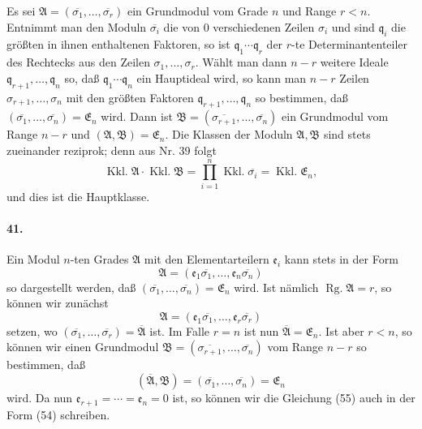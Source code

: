 \documentclass[11pt]{article}
\newcommand{\Rg}{\operatorname{Rg.}}
\newcommand{\Kkl}{\operatorname{Kkl.}}
\begin{document}
Es sei $\mathfrak A=(\overline{\sigma_1},
\ldots,
\overline{\sigma_r})$ ein Grundmodul vom Grade $n$ und Range $r<n$. Entnimmt man den Moduln $\overline{\sigma_i}$ die von $0$ verschiedenen Zeilen $\sigma_i$ und sind $\mathfrak q_i$ die größten in ihnen enthaltenen Faktoren, so ist $\mathfrak q_1\cdots\mathfrak q_r$ der $r$-te Determinantenteiler des Rechtecks aus den Zeilen $\sigma_1,
\ldots,
\sigma_r$. Wählt man dann $n-r$ weitere Ideale $\mathfrak q_{r+1},
\ldots,
\mathfrak q_n$ so, daß $\mathfrak q_1\cdots\mathfrak q_n$ ein Hauptideal wird, so kann man $n-r$ Zeilen $\sigma_{r+1},
\ldots,
\sigma_n$ mit den größten Faktoren $\mathfrak q_{r+1},
\ldots,
\mathfrak q_n$ so bestimmen, daß $(\overline{\sigma_1},
\ldots,
\overline{\sigma_n})=\mathfrak E_n$ wird. Dann ist $\mathfrak B=(\overline{\sigma_{r+1}},
\ldots,
\overline{\sigma_n})$ ein Grundmodul vom Range $n-r$ und $(\mathfrak A,
\mathfrak B)=\mathfrak E_n$. Die Klassen der Moduln $\mathfrak A,
\mathfrak B$ sind stets zueinander reziprok; denn aus Nr. 39 folgt
\[
\Kkl\mathfrak A\cdot\Kkl\mathfrak B
=\prod_{i=1}^{n}\Kkl\overline{\sigma_i}
=\Kkl\mathfrak E_n,
\]
und dies ist die Hauptklasse.

\paragraph{41.}
Ein Modul $n$-ten Grades $\mathfrak A$ mit den Elementarteilern $\mathfrak e_i$ kann stets in der Form
\begin{equation}
\mathfrak A=(\mathfrak e_1\overline{\sigma_1},
\ldots,
\mathfrak e_n\overline{\sigma_n})
\tag{54}
\end{equation}
so dargestellt werden, daß $(\overline{\sigma_1},
\ldots,
\overline{\sigma_n})=\mathfrak E_n$ wird. Ist nämlich $\Rg\mathfrak A=r$, so können wir zunächst
\begin{equation}
\mathfrak A=(\mathfrak e_1\overline{\sigma_1},
\ldots,
\mathfrak e_r\overline{\sigma_r})
\tag{55}
\end{equation}
setzen, wo $(\overline{\sigma_1},
\ldots,
\overline{\sigma_r})=\overline{\mathfrak A}$ ist. Im Falle $r=n$ ist nun $\overline{\mathfrak A}=\mathfrak E_n$. Ist aber $r<n$, so können wir einen Grundmodul $\mathfrak B=(\overline{\sigma_{r+1}},
\ldots,
\overline{\sigma_n})$ vom Range $n-r$ so bestimmen, daß
\[
(\overline{\mathfrak A},
\mathfrak B)=(\overline{\sigma_1},
\ldots,
\overline{\sigma_n})=\mathfrak E_n
\]
wird. Da nun $\mathfrak e_{r+1}=\cdots=\mathfrak e_n=0$ ist, so können wir die Gleichung (55) auch in der Form (54) schreiben.
\end{document}
